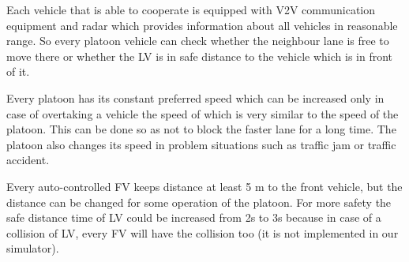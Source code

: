 Each vehicle that is able to cooperate is equipped with V2V communication equipment and radar which provides information about all vehicles in reasonable range. So every platoon vehicle can check whether the neighbour lane is free to move there or whether the LV is in safe distance to the vehicle which is in front of it.

Every platoon has its constant preferred speed which can be increased only in case of overtaking a vehicle the speed of which is very similar to the speed of the platoon. This can be done so as not to block the faster lane for a long time. The platoon also changes its speed in problem situations such as traffic jam or traffic accident.

Every auto-controlled FV keeps distance at least 5 m to the front vehicle, but the distance can be changed for some operation of the platoon. For more safety the safe distance time of LV could be increased from 2s to 3s because in case of a collision of LV, every FV will have the collision too (it is not implemented in our simulator).